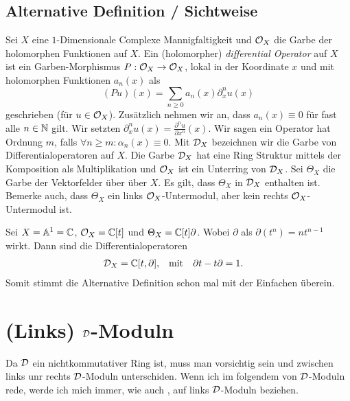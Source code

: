 \subsection{Alternative Definition / Sichtweise}
\cite[Chap 1.1.]{kashiwara2003d}
Sei $X$ eine $1$-Dimensionale Complexe Mannigfaltigkeit und $\mathcal{O}_X$ die Garbe
der holomorphen Funktionen auf $X$. Ein (holomorpher) \emph{differential
Operator} auf $X$ ist ein Garben-Morphismus $P:\mathcal{O}_X\rightarrow \mathcal{O}_X$, lokal
in der Koordinate $x$ und mit holomorphen Funktionen $a_n(x)$ als
\[
(Pu)(x)=\sum_{n\geq0}a_n(x)\partial_x^nu(x)
\]
geschrieben (für $u\in\mathcal{O}_X$). Zusätzlich nehmen wir an, dass $a_n(x)\equiv 0$
für fast alle $n\in \mathbb{N}$ gilt. Wir setzten
$\partial_x^nu(x)=\frac{\partial^nu}{\partial x^n}(x)$. Wir sagen ein Operator
hat Ordnung $m$, falls $\forall n\geq m: \alpha_n(x)\equiv0$.  Mit $\mathcal{D}_X$
bezeichnen wir die Garbe von Differentialoperatoren auf $X$. Die Garbe $\mathcal{D}_X$
hat eine Ring Struktur mittels der Komposition als Multiplikation und $\mathcal{O}_X$
ist ein Unterring von $\mathcal{D}_X$. Sei $\Theta_X$ die Garbe der Vektorfelder über
über $X$. Es gilt, dass $\Theta_X$ in $\mathcal{D}_X$ enthalten ist. Bemerke auch, dass
$\Theta_X$ ein links $\mathcal{O}_X$-Untermodul, aber kein rechts $\mathcal{O}_X$-Untermodul ist.

\begin{prop}
\cite[Exmp 1.1]{ArkhipovDmod}
Sei $X=\mathbb{A}^1=\mathbb{C}$, $\mathcal{O}_X=\mathbb{C}[t]$ und $\Theta_X=\mathbb{C}[t]\partial$. Wobei $\partial$
als $\partial(t^n)=nt^{n-1}$ wirkt. Dann sind die Differentialoperatoren 
\begin{align*}
\mathcal{D}_X &= \mathbb{C}[t,\partial], & \mbox{mit} & & \partial t-t\partial & =1.
\end{align*}
Somit stimmt die Alternative Definition schon mal mit der Einfachen überein.
\end{prop}

\begin{comment}
\begin{defn} \cite[Defn 2.1]{ArkhipovDmod}
Sei $X=\A^1$, $\cO_X=\C[t]$ und $\cD_X=[t,\partial]$ mit der Relation
$[\partial,t]=1$. Dann definieren wir die links $\cD$-Moduln über $\A^1$ als
die $\C[t,\partial]$-Moduln. Sie werden geschrieben als $\cD-mod(\A^1)$
\end{defn}
\end{comment}

\section{(Links) $\mathcal{D}$-Moduln}
Da $\mathcal{D}$ ein nichtkommutativer Ring ist, muss man vorsichtig sein und zwischen
links unr rechts $\mathcal{D}$-Moduln unterschiden. Wenn ich im folgendem von
$\mathcal{D}$-Moduln rede, werde ich mich immer, wie auch \cite[Chapter
1.6.]{arapuraNotes}, auf links $\mathcal{D}$-Moduln beziehen.

